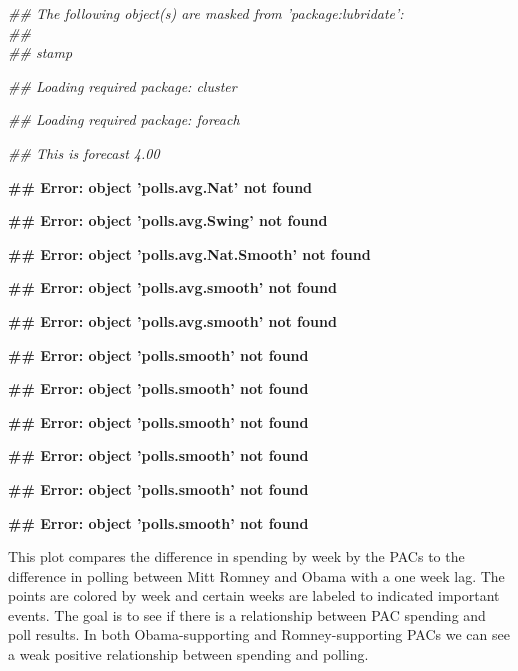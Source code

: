 \documentclass[11pt]{article}\usepackage{graphicx, color}
\makeatletter
\newenvironment{kframe}{%
 \def\at@end@of@kframe{}%
 \ifinner\ifhmode%
  \def\at@end@of@kframe{\end{minipage}}%
  \begin{minipage}{\columnwidth}%
 \fi\fi%
 \def\FrameCommand##1{\hskip\@totalleftmargin \hskip-\fboxsep
 \colorbox{shadecolor}{##1}\hskip-\fboxsep
     \hskip-\linewidth \hskip-\@totalleftmargin \hskip\columnwidth}%
 \MakeFramed {\advance\hsize-\width
   \@totalleftmargin\z@ \linewidth\hsize
   \@setminipage}}%
 {\par\unskip\endMakeFramed%
 \at@end@of@kframe}
\newenvironment{knitrout}{}{} %
\makeatother
\begin{document}
\begin{knitrout}
\begin{kframe}
{\ttfamily\noindent\itshape\textcolor{messagecolor}{\#\# The following object(s) are masked from 'package:lubridate':\\\#\# \\\#\#     stamp}}

{\ttfamily\noindent\itshape\textcolor{messagecolor}{\#\# Loading required package: cluster}}

{\ttfamily\noindent\itshape\textcolor{messagecolor}{\#\# Loading required package: foreach}}

{\ttfamily\noindent\itshape\textcolor{messagecolor}{\#\# This is forecast 4.00}}

{\ttfamily\noindent\bfseries\textcolor{errorcolor}{\#\# Error: object 'polls.avg.Nat' not found}}

{\ttfamily\noindent\bfseries\textcolor{errorcolor}{\#\# Error: object 'polls.avg.Swing' not found}}

{\ttfamily\noindent\bfseries\textcolor{errorcolor}{\#\# Error: object 'polls.avg.Nat.Smooth' not found}}

{\ttfamily\noindent\bfseries\textcolor{errorcolor}{\#\# Error: object 'polls.avg.smooth' not found}}

{\ttfamily\noindent\bfseries\textcolor{errorcolor}{\#\# Error: object 'polls.avg.smooth' not found}}

{\ttfamily\noindent\bfseries\textcolor{errorcolor}{\#\# Error: object 'polls.smooth' not found}}

{\ttfamily\noindent\bfseries\textcolor{errorcolor}{\#\# Error: object 'polls.smooth' not found}}

{\ttfamily\noindent\bfseries\textcolor{errorcolor}{\#\# Error: object 'polls.smooth' not found}}

{\ttfamily\noindent\bfseries\textcolor{errorcolor}{\#\# Error: object 'polls.smooth' not found}}

{\ttfamily\noindent\bfseries\textcolor{errorcolor}{\#\# Error: object 'polls.smooth' not found}}

{\ttfamily\noindent\bfseries\textcolor{errorcolor}{\#\# Error: object 'polls.smooth' not found}}\end{kframe}
\end{knitrout}


This plot compares the difference in spending by week by the PACs to the difference in polling between Mitt Romney and Obama with a one week lag. The points are colored by week and certain weeks are labeled to indicated important events. The goal is to see if there is a relationship between PAC spending and poll results. 
In both Obama-supporting and Romney-supporting PACs we can see a weak positive relationship between spending and polling.
\end{document}
